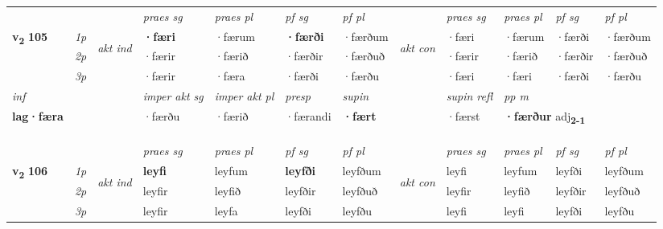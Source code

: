 \begin{longtable}[l]{X>{\footnotesize\itshape}llXXXXlXXXX}
 & &   & \textit{praes sg}  & \textit{praes pl}    & \textit{ pf sg} & \textit{pf pl} & & \textit{praes sg}  & \textit{praes pl}    & \textit{pf sg} & \textit{pf pl }  \\ \cmidrule{4-7} \cmidrule{9-12}
 \multirow{2}{*}{{{\textbf{v{\textsubscript{2}}} \Large{\textbf{105}}}}}  & 1p & \multirow{3}{*}{\begin{turn}{90}\textit{akt ind}\end{turn}} & \textbf{·færi} & ·færum & \textbf{·færði} & ·færðum & \multirow{3}{*}{\begin{turn}{90}\textit{akt con}\end{turn}} &·færi & ·færum & ·færði & ·færðum\\*
 & 2p &  &  ·færir  & ·færið & ·færðir & ·færðuð & & ·færir & ·færið & ·færðir & ·færðuð \\*
 & 3p &  & ·færir & ·færa & ·færði & ·færðu & & ·færi & ·færi& ·færði & ·færðu \\*
\cmidrule{4-7} \cmidrule{9-12}

   {\textit{inf}} & &  & \textit{imper akt sg} & \textit{imper akt pl}   & \textit{presp} & \textit{supin} && \textit{supin refl} & \textit{pp m} \\*
  {\textbf{lag\allowbreak ·færa}} & && ·færðu  & ·færið   & ·færandi &  \textbf{·fært} && ·færst & \multicolumn{2}{l}{\textbf{·færður} adj\textbf{\textsubscript{2-1}}} \\*

\midrule
& \\*
  & \\*
  & \\
    \midrule
 & &   & \textit{praes sg}  & \textit{praes pl}    & \textit{ pf sg} & \textit{pf pl} & & \textit{praes sg}  & \textit{praes pl}    & \textit{pf sg} & \textit{pf pl }  \\ \cmidrule{4-7} \cmidrule{9-12}
 \multirow{2}{*}{{{\textbf{v{\textsubscript{2}}} \Large{\textbf{106}}}}}  & 1p & \multirow{3}{*}{\begin{turn}{90}\textit{akt ind}\end{turn}} & \textbf{leyfi} & leyfum & \textbf{leyfði} & leyfðum & \multirow{3}{*}{\begin{turn}{90}\textit{akt con}\end{turn}} &leyfi & leyfum & leyfði & leyfðum\\*
 & 2p &  &  leyfir  & leyfið & leyfðir & leyfðuð & & leyfir & leyfið & leyfðir & leyfðuð \\*
 & 3p &  & leyfir & leyfa & leyfði & leyfðu & & leyfi & leyfi& leyfði & leyfðu \\*
\cmidrule{4-7} \cmidrule{9-12}


\end{longtable}
